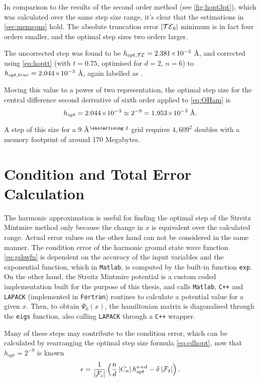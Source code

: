 In comparison to the results of the second order method (see \cref{fig:hopt3pt}), which was calculated over the same step size range, it's clear that the estimations in \cref{sec:memcons} hold.
The absolute truncation error $\left\lvert \mathcal{TE}_6\right\rvert$ minimum is in fact four orders smaller, and the optimal step sizes two orders larger.

The uncorrected step  was found to be $h_{opt,\mathcal{TE}} = 2.381\!\times\!10^{-3}$ Å, and corrected using \cref{eq:hoptt} (with $t=0.75$, optimised for $d=2$, $n=6$) to $h_{opt,true} = 2.044\!\times\!10^{-3}$ Å, again labelled as .

Moving this value to a power of two representation, the optimal step size for the central difference second derivative of sixth order applied to \cref{eq:OHam} is
\begin{equation}
h_{opt} = 2.044\!\times\!10^{-3} \simeq 2^{-9} = 1.953\!\times\!10^{-3}\;\text{Å}.
\end{equation}

A step of this size for a $9$ Å$^\text{\skolarlining 2}$ grid requires $4,609^2$ doubles with a memory footprint of around 170 Megabytes.

\section{Condition and Total Error Calculation}

The harmonic approximation is useful for finding the optimal step of the Streitz Mintmire method only because the change in $x$ is equivalent over the calculated range.
Actual error values on the other hand can not be considered in the same manner.
The condition error of the harmonic ground state wave function \cref{eq:gshwfn} is dependent on the accuracy of the input variables and the exponential function, which in \texttt{Matlab}, is computed by the built-in function \texttt{exp}.
On the other hand, the Streitz Mintmire potential is a custom coded implementation built for the purpose of this thesis, and calls \texttt{Matlab}, \texttt{C++} and \texttt{LAPACK} (implemented in \texttt{Fortran}) routines to calculate a potential value for a given $x$.
Then, to obtain $\Psi_0(x)$, the hamiltonian matrix is diagonalised through the \texttt{eigs} function, also calling \texttt{LAPACK} through a \texttt{C++} wrapper.

Many of these steps may contribute to the condition error, which can be calculated by rearranging the optimal step size formula \cref{eq:cdhopt}, now that $h_{opt} = 2^{-9}$ is known
\begin{equation}
\epsilon = \frac{1}{\left\lvert \mathcal{F}_\epsilon\right\rvert}\left(\frac{n}{d}\left\lvert C_n\right\rvert h_{opt}^{n+d}-\delta\left\lvert \mathcal{F}_\delta\right\rvert\right).
\end{equation}

